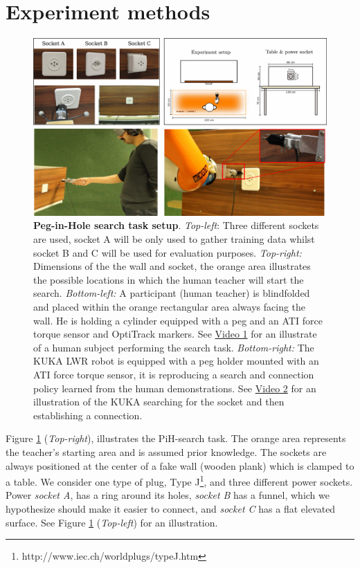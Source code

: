 \documentclass[final,5p,times,twocolumn]{elsarticle}
\begin{document}
\section{Experiment methods}\label{sec:experiment_methods}

\begin{figure}
 \centering
 \includegraphics[width=0.85\linewidth]{./Figure/Figure1.pdf}
 \caption{\textbf{Peg-in-Hole search task setup}.
  \textit{Top-left}: Three different sockets are used, socket A will be only used to gather training data whilst socket B and 
  C will be used for evaluation purposes.  \textit{Top-right:} Dimensions of the the wall and socket, the orange area illustrates the possible locations 
  in which the human teacher will start the search.
  \textit{Bottom-left:} A participant (human teacher) is blindfolded and  placed within the orange rectangular area always 
  facing the wall. He is holding a cylinder equipped with a peg and an  ATI force torque sensor and OptiTrack markers. See \href{http://lasa.epfl.ch/videos/gpldecha/pih-search/human_search.wmv}{Video 1} for 
  an illustrate of a human subject performing the search task.
  \textit{Bottom-right:} The KUKA LWR robot is equipped with a peg holder mounted with an ATI force torque sensor, it is reproducing a search 
  and connection policy learned from the human demonstrations. See \href{http://lasa.epfl.ch/videos/gpldecha/pih-search/KUKA_pih-search.wmv}{Video 2} for an illustration of the KUKA searching for the socket and then 
  establishing a connection.}
    \label{fig:search_task_setup}
\end{figure}

Figure \ref{fig:search_task_setup} (\textit{Top-right}), illustrates the PiH-search task. The orange area represents 
the teacher's starting area and is assumed prior knowledge. The sockets are always positioned at the center of a fake 
wall (wooden plank) which is clamped to a table. We consider one type of plug, 
Type J\footnote{http://www.iec.ch/worldplugs/typeJ.htm}, and three different power sockets. 
Power \textit{socket A}, has a ring around its holes, \textit{socket B} has a funnel, which we hypothesize should make 
it easier to connect, and \textit{socket C} has a flat elevated surface. See Figure \ref{fig:search_task_setup}
(\textit{Top-left}) for an illustration. 
\end{document}
